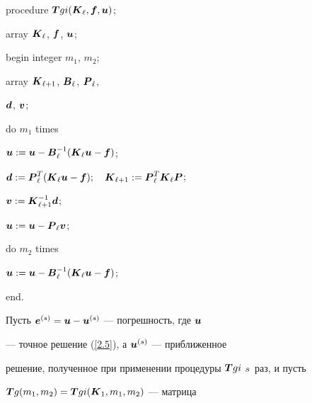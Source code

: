 procedure $\boldsymbol Tgi(\boldsymbol K_\ell,\boldsymbol f,\boldsymbol u)$;





array $\boldsymbol K_\ell$, $\boldsymbol f$, $\boldsymbol u$;





begin integer $m_1$, $m_2$;





\qquad array $\boldsymbol K_{\ell+1}$, $\boldsymbol B_\ell$, $\boldsymbol P_\ell$,


$\boldsymbol d$, $\boldsymbol v$;





\qquad do $m_1$ times





\qquad \quad \qquad $\bi u:=\bi u-\bi B^{-1}_\ell(\bi K_\ell


\bi u-\bi f)$;





\qquad $\bi d:=\bi P^T_\ell(\bi K_\ell\bi u-\bi f);\quad


\bi K_{\ell+1}:=\bi P^T_\ell\bi K_\ell\bi P$;





\qquad $\boldsymbol v:=\boldsymbol K^{-1}_{\ell+1}\boldsymbol d$;





\qquad $\boldsymbol u:=\boldsymbol u-\boldsymbol P_\ell\boldsymbol v$;





\qquad do $m_2$ times





\qquad \quad \qquad $\bi u:=\bi u-\bi B^{-1}_\ell(\bi K_\ell


\bi u-\bi f)$;





end.





Пусть $\boldsymbol e^{(s)}=\boldsymbol u-\boldsymbol u^{(s)}$ --- погрешность, где $\boldsymbol u$


--- точное решение (\ref{2.5}), а $\boldsymbol u^{(s)}$ --- приближенное


решение, полученное при применении процедуры $\boldsymbol Tgi$\; $s$~раз, и пусть


$\boldsymbol Tg(m_1,m_2)=\boldsymbol Tgi(\boldsymbol K_1,m_1,m_2)$ --- матрица


